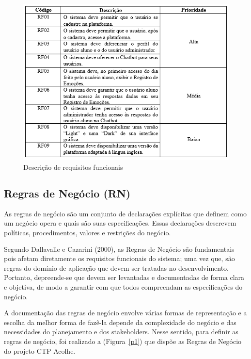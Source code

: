 \documentclass[12pt,a4paper]{article}
\begin{document}
\newpage

\begin{figure}[H]
    \centering
     \includegraphics[width=15cm]{img6.png}
    \caption{Descrição de requisitos funcionais}
    \label{o6}
\end{figure}

\subsection{Regras de Negócio (RN)}
As regras de negócio são um conjunto de declarações explícitas que definem como um negócio opera e quais são suas especificações. Essas declarações descrevem políticas, procedimentos, valores e restrições do negócio.

Segundo Dallavalle e Cazarini (2000), as Regras de Negócio são fundamentais pois afetam diretamente os requisitos funcionais do sistema; uma vez que, são regras do domínio de aplicação que devem ser tratadas no desenvolvimento.
Portanto, depreende-se que devem ser levantadas e documentadas de forma clara e objetiva, de modo a garantir com que todos compreendam as especificações do negócio. \cite{artigoo}

A documentação das regras de negócio envolve várias formas de representação e a escolha da melhor forma de fazê-la depende da complexidade do negócio e das necessidades do planejamento e dos stakeholders. Nesse sentido, para definir as regras de negócio, foi realizado a (Figura~\ref{p1}) que dispõe as Regras de Negócio do projeto CTP Acolhe. \cite{artigoo}

\newpage
\end{document}
